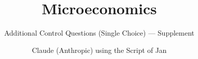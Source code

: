 
\documentclass[paper=a5]{scrartcl}
\usepackage{xcolor}
\usepackage{hsbcommon}
\usepackage[hidelinks]{hyperref}
\usepackage[utf8]{inputenc}
\usepackage{setspace}
\usepackage{pgfplots}
\pgfplotsset{compat=1.18}
\usepackage{hsbquestions}
\showanswerstrue                 %

\title{Microeconomics}
\subtitle{Additional Control Questions (Single Choice) — Supplement}
\author{Claude (Anthropic) using the Script of Jan }


\onehalfspacing
\maketitle
\clearpage

